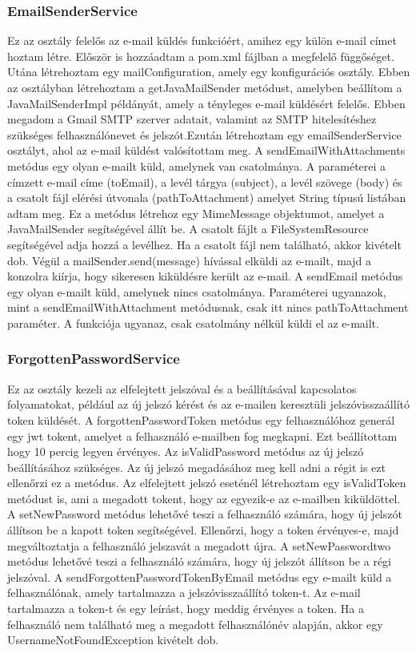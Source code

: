 \subsubsection{EmailSenderService}

Ez az osztály felelős az e-mail küldés funkcióért, amihez egy külön e-mail címet hoztam létre. Először is hozzáadtam a pom.xml fájlban a megfelelő függőséget. Utána létrehoztam egy mailConfiguration, amely egy konfigurációs osztály. Ebben az osztályban létrehoztam a getJavaMailSender metódust, amelyben beállítom a JavaMailSenderImpl példányát, amely a tényleges e-mail küldésért felelős. Ebben megadom a Gmail SMTP szerver adatait, valamint az SMTP hitelesítéshez szükséges felhasználónevet és jelszót.Ezután létrehoztam egy emailSenderService osztályt, ahol az e-mail küldést valósítottam meg. A sendEmailWithAttachments metódus egy olyan e-mailt küld, amelynek van csatolmánya. A paraméterei a címzett e-mail címe (toEmail), a levél tárgya (subject), a levél szövege (body) és a csatolt fájl elérési útvonala (pathToAttachment) amelyet String típusú listában adtam meg. Ez a metódus létrehoz egy MimeMessage objektumot, amelyet a JavaMailSender segítségével állít be. A csatolt fájlt a FileSystemResource segítségével adja hozzá a levélhez. Ha a csatolt fájl nem található, akkor kivételt dob. Végül a mailSender.send(message) hívással elküldi az e-mailt, majd a konzolra kiírja, hogy sikeresen kiküldésre került az e-mail. A sendEmail metódus egy olyan e-mailt küld, amelynek nincs csatolmánya. Paraméterei ugyanazok, mint a sendEmailWithAttachment metódusnak, csak itt nincs pathToAttachment paraméter. A funkciója ugyanaz, csak csatolmány nélkül küldi el az e-mailt.

\subsubsection{ForgottenPasswordService}

Ez az osztály kezeli az elfelejtett jelszóval és a beállításával kapcsolatos folyamatokat, például az új jelszó kérést és az e-mailen keresztüli jelszóvisszaállító token küldését. A forgottenPasswordToken metódus egy felhasználóhoz generál egy jwt tokent, amelyet a felhasználó e-mailben fog megkapni. Ezt beállítottam hogy 10 percig legyen érvényes. Az isValidPassword metódus az új jelszó beállításához szükséges. Az új jelszó megadásához meg kell adni a régit is ezt ellenőrzi ez a metódus. Az elfelejtett jelszó eseténél létrehoztam egy isValidToken metódust is, ami a megadott tokent, hogy az egyezik-e az e-mailben kiküldöttel. A setNewPassword metódus lehetővé teszi a felhasználó számára, hogy új jelszót állítson be a kapott token segítségével. Ellenőrzi, hogy a token érvényes-e, majd megváltoztatja a felhasználó jelszavát a megadott újra. A setNewPasswordtwo metódus lehetővé teszi a felhasználó számára, hogy új jelszót állítson be a régi jelszóval. A sendForgottenPasswordTokenByEmail metódus egy e-mailt küld a felhasználónak, amely tartalmazza a jelszóvisszaállító token-t. Az e-mail tartalmazza a token-t és egy leírást, hogy meddig érvényes a token. Ha a felhasználó nem található meg a megadott felhasználónév alapján, akkor egy UsernameNotFoundException kivételt dob.

